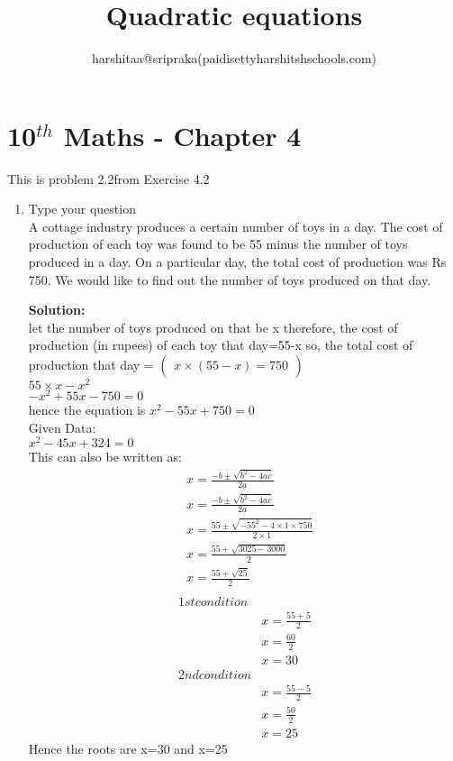\documentclass[12pt]{article}
\title{Quadratic equations}
\author{harshitaa@sripraka(paidisettyharshitshschools.com)}
\newcommand{\myvec}[1]{\ensuremath{\begin{pmatrix}#1\end{pmatrix}}}
\newcommand{\solution}{\noindent \textbf{Solution: }}
\begin{document}
\maketitle
\section*{10$^{th}$ Maths - Chapter 4}
This is problem 2.2from Exercise 4.2
\begin{enumerate}
\item Type your question \\
 A cottage industry produces a certain number of toys in a day. The cost of production of each  toy was found to be 55 minus the number of toys produced in a day. On a particular day, the total cost of production was Rs 750. We would like to find out the number of toys produced on that day.
 
\solution\\
let the number of toys produced on that be x
therefore, the cost of production (in rupees) of each toy that day=55-x
so, the total cost of production that day =
\myvec{{x\times(55-x)}=750}\\
${55\times x-x^2}$\\
${-x^2+55x-750=0}$\\
 hence the equation is
 ${x^2-55x+750=0}$\\
 Given Data:\\
${x^2-45x+324=0}$ \\
This can also be written as:
\begin{align}
&x=\frac{-b\pm\sqrt{b^2-4ac}}{2a}\\
&x=\frac{-b\pm\sqrt{b^2-4ac}}{2a}\\
&x=\frac{55\pm\sqrt{-55^2-4 \times 1\times750}}{2 \times 1}\\
&x=\frac{55+\sqrt{3025-3000}}{2}\\
&x=\frac{55+\sqrt{25}}{2}\\
\end{align}
\begin{align}
1st condition\\
&x=\frac{55+5}{2}\\
&x=\frac{60}{2}\\
&x=30\\
2nd condition\\
&x=\frac{55-5}{2}\\
&x=\frac{50}{2}\\
&x=25
\end{align}
Hence the roots are x=30 and x=25
\end{enumerate}
\end{document}
